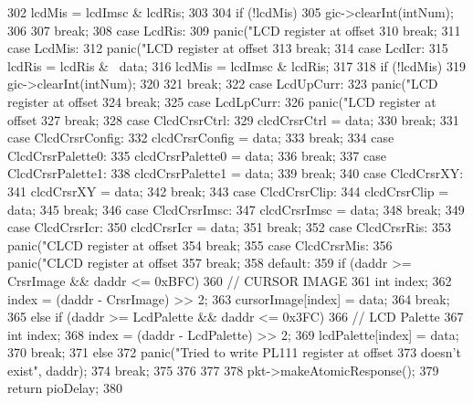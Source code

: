\begin{DoxyCode}
{{302         lcdMis = lcdImsc & lcdRis;
303 
304         if (!lcdMis)
305             gic->clearInt(intNum);
306 
307          break;
308       case LcdRis:
309         panic("LCD register at offset %
310         break;
311       case LcdMis:
312         panic("LCD register at offset %
313         break;
314       case LcdIcr:
315         lcdRis = lcdRis & ~data;
316         lcdMis = lcdImsc & lcdRis;
317 
318         if (!lcdMis)
319             gic->clearInt(intNum);
320 
321         break;
322       case LcdUpCurr:
323         panic("LCD register at offset %
324         break;
325       case LcdLpCurr:
326         panic("LCD register at offset %
327         break;
328       case ClcdCrsrCtrl:
329         clcdCrsrCtrl = data;
330         break;
331       case ClcdCrsrConfig:
332         clcdCrsrConfig = data;
333         break;
334       case ClcdCrsrPalette0:
335         clcdCrsrPalette0 = data;
336         break;
337       case ClcdCrsrPalette1:
338         clcdCrsrPalette1 = data;
339         break;
340       case ClcdCrsrXY:
341         clcdCrsrXY = data;
342         break;
343       case ClcdCrsrClip:
344         clcdCrsrClip = data;
345         break;
346       case ClcdCrsrImsc:
347         clcdCrsrImsc = data;
348         break;
349       case ClcdCrsrIcr:
350         clcdCrsrIcr = data;
351         break;
352       case ClcdCrsrRis:
353         panic("CLCD register at offset %
354         break;
355       case ClcdCrsrMis:
356         panic("CLCD register at offset %
357         break;
358       default:
359         if (daddr >= CrsrImage && daddr <= 0xBFC) {
360             // CURSOR IMAGE
361             int index;
362             index = (daddr - CrsrImage) >> 2;
363             cursorImage[index] = data;
364             break;
365         } else if (daddr >= LcdPalette && daddr <= 0x3FC) {
366             // LCD Palette
367             int index;
368             index = (daddr - LcdPalette) >> 2;
369             lcdPalette[index] = data;
370             break;
371         } else {
372             panic("Tried to write PL111 register at offset %
373                        doesn't exist\n", daddr);
374             break;
375         }
376     }
377 
378     pkt->makeAtomicResponse();
379     return pioDelay;
380 }
\end{DoxyCode}


